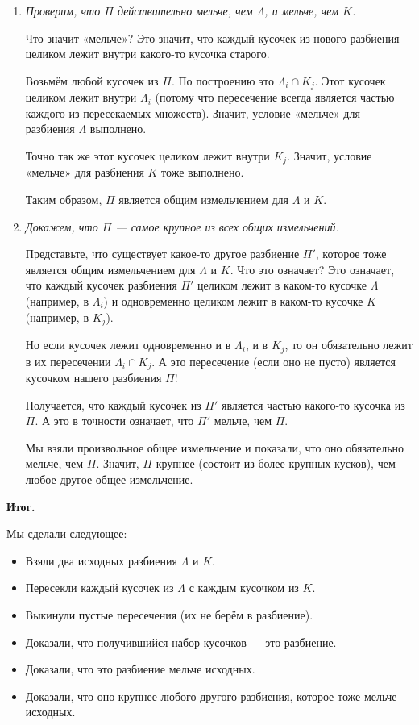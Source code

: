 \documentclass[a4paper,12pt]{article}
\begin{document}
\begin{enumerate}
	\item[\textbf{Шаг 1.}] \textit{Проверим, что $\Pi$ действительно мельче, чем $\Lambda$, и мельче, чем $K$.}
	
	Что значит «мельче»? Это значит, что каждый кусочек из нового разбиения целиком лежит внутри какого-то кусочка старого.
	
	Возьмём любой кусочек из $\Pi$. По построению это $\Lambda_i \cap K_j$. Этот кусочек целиком лежит внутри $\Lambda_i$ (потому что пересечение всегда является частью каждого из пересекаемых множеств). Значит, условие «мельче» для разбиения $\Lambda$ выполнено.
	
	Точно так же этот кусочек целиком лежит внутри $K_j$. Значит, условие «мельче» для разбиения $K$ тоже выполнено.
	
	Таким образом, $\Pi$ является общим измельчением для $\Lambda$ и $K$.
	
	\item[\textbf{Шаг 2.}] \textit{Докажем, что $\Pi$ — самое крупное из всех общих измельчений.}
	
	Представьте, что существует какое-то другое разбиение $\Pi'$, которое тоже является общим измельчением для $\Lambda$ и $K$. Что это означает? Это означает, что каждый кусочек разбиения $\Pi'$ целиком лежит в каком-то кусочке $\Lambda$ (например, в $\Lambda_i$) и одновременно целиком лежит в каком-то кусочке $K$ (например, в $K_j$).
	
	Но если кусочек лежит одновременно и в $\Lambda_i$, и в $K_j$, то он обязательно лежит в их пересечении $\Lambda_i \cap K_j$. А это пересечение (если оно не пусто) является кусочком нашего разбиения $\Pi$!
	
	Получается, что каждый кусочек из $\Pi'$ является частью какого-то кусочка из $\Pi$. А это в точности означает, что $\Pi'$ мельче, чем $\Pi$.
	
	Мы взяли произвольное общее измельчение и показали, что оно обязательно мельче, чем $\Pi$. Значит, $\Pi$ крупнее (состоит из более крупных кусков), чем любое другое общее измельчение.
\end{enumerate}

\vspace{0.4cm}
\noindent \textbf{Итог.}

Мы сделали следующее:
\begin{itemize}
	\item Взяли два исходных разбиения $\Lambda$ и $K$.
	\item Пересекли каждый кусочек из $\Lambda$ с каждым кусочком из $K$.
	\item Выкинули пустые пересечения (их не берём в разбиение).
	\item Доказали, что получившийся набор кусочков — это разбиение.
	\item Доказали, что это разбиение мельче исходных.
	\item Доказали, что оно крупнее любого другого разбиения, которое тоже мельче исходных.
\end{itemize}
\end{document}
